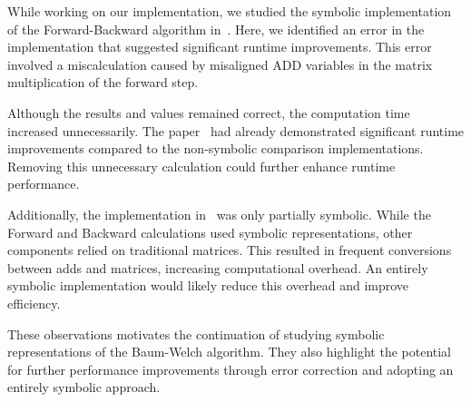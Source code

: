 While working on our implementation, we studied the symbolic implementation of the Forward-Backward algorithm in~\cite{p7}. Here, we identified an error in the implementation that suggested significant runtime improvements. This error involved a miscalculation caused by misaligned ADD variables in the matrix multiplication of the forward step.

Although the results and values remained correct, the computation time increased unnecessarily. The paper~\cite{p7} had already demonstrated significant runtime improvements compared to the non-symbolic comparison implementations. Removing this unnecessary calculation could further enhance runtime performance.

Additionally, the implementation in~\cite{p7} was only partially symbolic. While the Forward and Backward calculations used symbolic representations, other components relied on traditional matrices. This resulted in frequent conversions between \glspl{add} and matrices, increasing computational overhead. An entirely symbolic implementation would likely reduce this overhead and improve efficiency.

These observations motivates the continuation of studying symbolic representations of the Baum-Welch algorithm. They also highlight the potential for further performance improvements through error correction and adopting an entirely symbolic approach.


